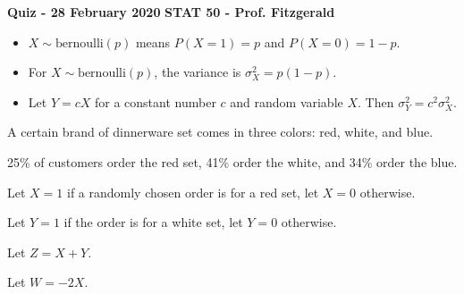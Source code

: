 \documentclass[12pt, addpoints]{exam}
\begin{document}
\textbf{Quiz - 28 February 2020}
\hfill
\textbf{STAT 50 - Prof. Fitzgerald}

\vspace{10mm}
 

\vspace{5mm}

\begin{itemize}
\item
$X \sim \text{bernoulli}(p)$ means $P(X = 1) = p$ and $P(X = 0) = 1 - p$.

\item 
For $X \sim \text{bernoulli}(p)$, the variance is $\sigma^2_X = p(1-p)$.

\item 
Let $Y = cX$ for a constant number $c$ and random variable $X$. Then $\sigma^2_Y = c^2 \sigma^2_X$.
\end{itemize}

A certain brand of dinnerware set comes in three colors: red, white, and blue. 

25\% of customers order the red set, 41\% order the white, and 34\% order the blue.

Let $X = 1$ if a randomly chosen order is for a red set, let $X = 0$ otherwise.

Let $Y = 1$ if the order is for a white set, let $Y = 0$ otherwise.

Let $Z = X + Y$.

Let $W = -2X$.
\end{document}
